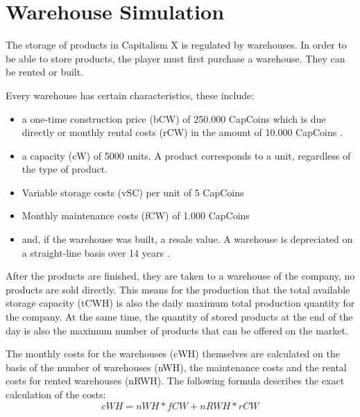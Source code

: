 \section{Warehouse Simulation} \label{warehouse_simulation}


The storage of products in Capitalism X is regulated by warehouses. In order to be able to store products, the player must first purchase a warehouse. They can be rented or built.

Every warehouse has certain characteristics, these include:
\begin{itemize}
    \item a one-time construction price (\gls{bCW}) of 250.000 CapCoins \cite{carrot_media_v.o.s._hallenbau_2018} which is due directly or monthly rental costs (\gls{rCW}) in the amount of 10.000 CapCoins \cite{jll_mietpreisspanne_nodate}.
    \item a capacity (\gls{cW}) of 5000 units. A product corresponds to a unit, regardless of the type of product.
    \item Variable storage costs (\gls{vSC}) per unit of 5 CapCoins
    \item Monthly maintenance costs (\gls{fCW}) of 1.000 CapCoins
    \item and, if the warehouse was built, a resale value. A warehouse is depreciated on a straight-line basis over 14 years \cite{noauthor_amtliche_nodate}.
\end{itemize}

After the products are finished, they are taken to a warehouse of the company, no products are sold directly. This means for the production that the total available storage capacity (\gls{tCWH}) is also the daily maximum total production quantity for the company. At the same time, the quantity of stored products at the end of the day is also the maximum number of products that can be offered on the market. 

The monthly costs for the warehouses (\gls{cWH}) themselves are calculated on the basis of the number of warehouses (\gls{nWH}), the maintenance costs and the rental costs for rented warehouses (\gls{nRWH}). The following formula describes the exact calculation of the costs:
\begin{equation}
\label{func:cWH} %
     cWH = nWH * fCW + nRWH * rCW
\end{equation}


